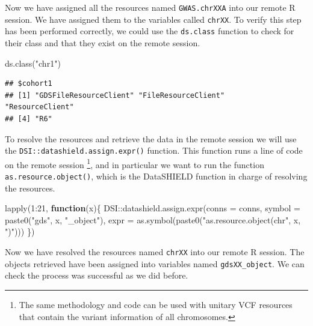 \documentclass[
]{book}
\newenvironment{Shaded}{\begin{snugshade}}{\end{snugshade}}
\newcommand{\AttributeTok}[1]{\textcolor[rgb]{0.77,0.63,0.00}{#1}}
\newcommand{\ControlFlowTok}[1]{\textcolor[rgb]{0.13,0.29,0.53}{\textbf{#1}}}
\newcommand{\DecValTok}[1]{\textcolor[rgb]{0.00,0.00,0.81}{#1}}
\newcommand{\FunctionTok}[1]{\textcolor[rgb]{0.00,0.00,0.00}{#1}}
\newcommand{\NormalTok}[1]{#1}
\newcommand{\SpecialCharTok}[1]{\textcolor[rgb]{0.00,0.00,0.00}{#1}}
\newcommand{\StringTok}[1]{\textcolor[rgb]{0.31,0.60,0.02}{#1}}
\begin{document}
Now we have assigned all the resources named \texttt{GWAS.chrXXA} into our remote R session. We have assigned them to the variables called \texttt{chrXX}. To verify this step has been performed correctly, we could use the \texttt{ds.class} function to check for their class and that they exist on the remote session.

\begin{Shaded}
\begin{Highlighting}[]
\FunctionTok{ds.class}\NormalTok{(}\StringTok{"chr1"}\NormalTok{)}
\end{Highlighting}
\end{Shaded}

\begin{verbatim}
## $cohort1
## [1] "GDSFileResourceClient" "FileResourceClient"    "ResourceClient"       
## [4] "R6"
\end{verbatim}

To resolve the resources and retrieve the data in the remote session we will use the \texttt{DSI::datashield.assign.expr()} function. This function runs a line of code on the remote session \footnote{The same methodology and code can be used with unitary VCF resources that contain the variant information of all chromosomes.}, and in particular we want to run the function \texttt{as.resource.object()}, which is the DataSHIELD function in charge of resolving the resources.

\begin{Shaded}
\begin{Highlighting}[]
\FunctionTok{lapply}\NormalTok{(}\DecValTok{1}\SpecialCharTok{:}\DecValTok{21}\NormalTok{, }\ControlFlowTok{function}\NormalTok{(x)\{}
\NormalTok{  DSI}\SpecialCharTok{::}\FunctionTok{datashield.assign.expr}\NormalTok{(}\AttributeTok{conns =}\NormalTok{ conns, }\AttributeTok{symbol =} \FunctionTok{paste0}\NormalTok{(}\StringTok{"gds"}\NormalTok{, x, }\StringTok{"\_object"}\NormalTok{),}
                            \AttributeTok{expr =} \FunctionTok{as.symbol}\NormalTok{(}\FunctionTok{paste0}\NormalTok{(}\StringTok{"as.resource.object(chr"}\NormalTok{, x, }\StringTok{")"}\NormalTok{)))}
\NormalTok{\})}
\end{Highlighting}
\end{Shaded}

Now we have resolved the resources named \texttt{chrXX} into our remote R session. The objects retrieved have been assigned into variables named \texttt{gdsXX\_object}. We can check the process was successful as we did before.
\end{document}
